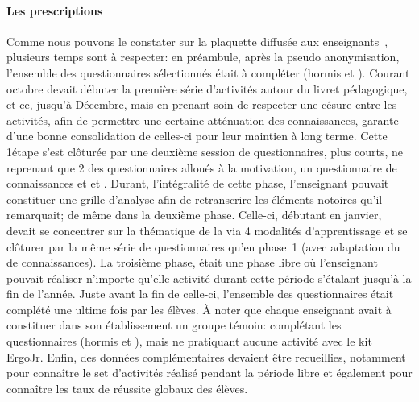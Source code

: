         \paragraph{Les prescriptions}
            Comme nous pouvons le constater sur la plaquette diffusée aux enseignants~, plusieurs temps sont à respecter: en préambule, après la pseudo anonymisation, l'ensemble des questionnaires sélectionnés était à compléter (hormis  et ). Courant octobre devait débuter la première série d'activités autour du livret pédagogique, et ce, jusqu'à Décembre, mais en prenant soin de respecter une césure entre les activités, afin de permettre une certaine atténuation des connaissances, garante d'une bonne consolidation de celles-ci pour leur maintien à long terme. Cette 1\iere étape s'est clôturée par une deuxième session de questionnaires, plus courts, ne reprenant que 2 des questionnaires alloués à la motivation, un questionnaire de connaissances et  et . Durant, l'intégralité de cette phase, l'enseignant pouvait constituer une grille d'analyse afin de retranscrire les éléments notoires qu'il remarquait; de même dans la deuxième phase.
            Celle-ci, débutant en janvier, devait se concentrer sur la thématique de la   via 4 modalités d'apprentissage et se clôturer par la même série de questionnaires qu'en phase~1 (avec adaptation du  de connaissances). 
            La troisième phase, était une phase libre où l'enseignant pouvait réaliser n'importe qu'elle activité durant cette période s'étalant jusqu'à la fin de l'année. Juste avant la fin de celle-ci, l'ensemble des questionnaires était complété une ultime fois par les élèves. À noter que chaque enseignant avait à constituer dans son établissement un groupe témoin: complétant les questionnaires (hormis  et ), mais ne pratiquant aucune activité avec le kit ErgoJr. 
            Enfin, des données complémentaires devaient être recueillies, notamment pour connaître le set d'activités réalisé pendant la période libre et également pour connaître les taux de réussite globaux des élèves.
